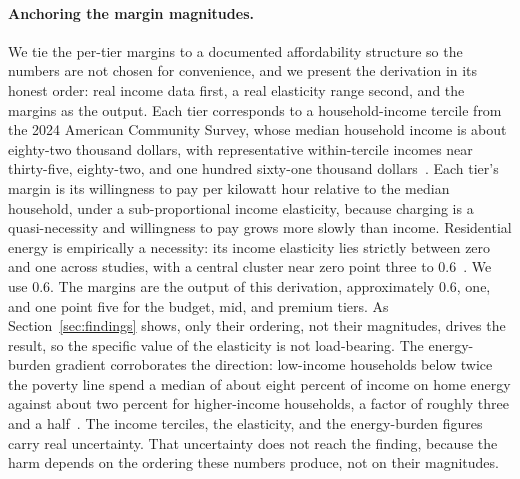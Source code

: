 \documentclass[manuscript, screen, review, anonymous]{acmart}
\begin{document}
\paragraph{Anchoring the margin magnitudes.}
We tie the per-tier margins to a documented affordability structure so the numbers are not chosen for convenience, and we present the derivation in its honest order: real income data first, a real elasticity range second, and the margins as the output. Each tier corresponds to a household-income tercile from the 2024 American Community Survey, whose median household income is about eighty-two thousand dollars, with representative within-tercile incomes near thirty-five, eighty-two, and one hundred sixty-one thousand dollars~\cite{acs2024}. Each tier's margin is its willingness to pay per kilowatt hour relative to the median household, under a sub-proportional income elasticity, because charging is a quasi-necessity and willingness to pay grows more slowly than income. Residential energy is empirically a necessity: its income elasticity lies strictly between zero and one across studies, with a central cluster near zero point three to 0.6~\cite{schulte2017price,espey2004turning}. We use 0.6. The margins are the output of this derivation, approximately 0.6, one, and one point five for the budget, mid, and premium tiers. As Section~\ref{sec:findings} shows, only their ordering, not their magnitudes, drives the result, so the specific value of the elasticity is not load-bearing. The energy-burden gradient corroborates the direction: low-income households below twice the poverty line spend a median of about eight percent of income on home energy against about two percent for higher-income households, a factor of roughly three and a half~\cite{drehobl2020high}. The income terciles, the elasticity, and the energy-burden figures carry real uncertainty. That uncertainty does not reach the finding, because the harm depends on the ordering these numbers produce, not on their magnitudes.
\end{document}
